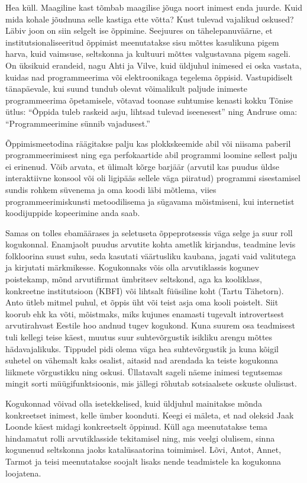 Hea küll. Maagiline kast tõmbab maagilise jõuga noort inimest enda juurde. Kuid 
mida kohale jõudnuna selle kastiga ette võtta? Kust tulevad vajalikud 
oskused? Läbiv joon on siin selgelt ise õppimine. Seejuures on 
tähelepanuväärne, et institutsionaliseeritud õppimist meenutatakse sisu mõttes 
kasulikuna pigem harva, kuid vaimsuse, seltskonna ja kultuuri mõttes 
valgustavana pigem sageli. On üksikuid erandeid, nagu Ahti ja Vilve, kuid 
üldjuhul inimesed ei oska vastata, kuidas nad programmeerima või elektroonikaga 
tegelema õppisid. Vastupidiselt tänapäevale, kui suund tundub olevat võimalikult 
paljude inimeste programmeerima õpetamisele, võtavad toonase suhtumise 
kenasti kokku Tõnise ütlus: \enquote{Õppida tuleb raskeid asju, lihtsad 
tulevad iseenesest} ning Andruse oma: \enquote{Programmeerimine sünnib 
vajadusest.}

Õppimismeetodina räägitakse palju kas plokkskeemide abil või niisama paberil 
programmeerimisest ning ega perfokaartide abil programmi loomine sellest palju 
ei erinenud. Võib arvata, et ülimalt kõrge barjäär (arvutil kas puudus üldse 
interaktiivne konsool või oli ligipääs sellele väga piiratud) programmi 
sisestamisel sundis rohkem süvenema ja oma koodi läbi mõtlema, viies 
programmeerimiskunsti metoodilisema ja sügavama mõistmiseni, kui internetist 
koodijuppide kopeerimine anda saab.

Samas on tolles ebamäärases ja seletuseta õppeprotsessis väga selge ja suur 
roll kogukonnal. Enamjaolt puudus arvutite kohta ametlik kirjandus, teadmine 
levis folkloorina suust suhu, seda kasutati väärtusliku kaubana, jagati 
vaid valitutega ja kirjutati märkmikesse. Kogukonnaks võis olla 
arvutiklassis kogunev poistekamp, mõnd arvutifirmat ümbritsev seltskond, aga ka 
kooliklass, konkreetne institutsioon (KBFI) või lihtsalt füüsiline koht (Tartu 
Tähetorn). Anto ütleb mitmel puhul, et õppis üht või teist asja oma kooli 
poistelt. Siit koorub ehk ka võti, mõistmaks, miks kujunes enamasti tugevalt 
introvertsest arvutirahvast Eestile hoo andnud tugev kogukond. Kuna suurem osa 
teadmisest tuli kellegi teise käest, muutus suur suhtevõrgustik isikliku arengu 
mõttes hädavajalikuks. Tippudel pidi olema väga hea suhtevõrgustik ja kuna 
kõigil suhetel on vähemalt kaks osalist, aitasid nad arendada ka teiste kogukonna 
liikmete võrgustikku ning oskusi. Üllatavalt sageli näeme inimesi tegutsemas 
mingit sorti müügifunktsioonis, mis jällegi rõhutab sotsiaalsete oskuste 
olulisust. 

Kogukonnad võivad olla isetekkelised, kuid üldjuhul mainitakse mõnda 
konkreetset inimest, kelle ümber koonduti. Keegi ei mäleta, et nad oleksid 
Jaak Loonde käest midagi konkreetselt õppinud. Küll 
aga meenutatakse tema hindamatut rolli arvutiklasside tekitamisel ning, mis 
veelgi olulisem, sinna kogunenud seltskonna jaoks katalüsaatorina toimimisel. 
Lõvi, Antot, Annet, Tarmot ja teisi meenutatakse soojalt lisaks 
nende teadmistele ka kogukonna loojatena. 

